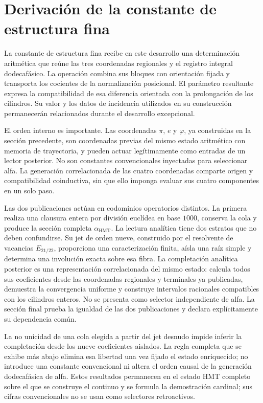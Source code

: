 \section{Derivación de la constante de estructura fina}
\label{sec:alpha}

La constante de estructura fina recibe en este desarrollo una determinación
aritmética que reúne las tres coordenadas regionales y el registro integral
dodecafásico. La operación combina sus bloques con orientación fijada y
transporta los cocientes de la normalización posicional. El parámetro
resultante expresa la compatibilidad de esa diferencia orientada con
la prolongación de los cilindros. Su valor y los datos de incidencia
utilizados en su construcción permanecerán relacionados durante el
desarrollo excepcional.

El orden interno es importante. Las coordenadas \(\pi\),
\(e\) y \(\varphi\), ya construidas en la sección precedente, son coordenadas
previas del mismo estado aritmético con memoria de trayectoria, y pueden actuar legítimamente como
entradas de un lector posterior. No son constantes convencionales
inyectadas para seleccionar alfa. La generación correlacionada de las cuatro coordenadas comparte origen y
compatibilidad coinductiva, sin que ello imponga evaluar sus cuatro
componentes en un solo paso.

Las dos publicaciones actúan en codominios operatorios distintos. La primera
realiza una clausura entera por división euclídea en base \(1000\), conserva la
cola y produce la sección completa \(\alpha_{\mathrm{HMT}}\). La lectura
analítica tiene dos estratos que no deben confundirse. Su jet de orden nueve,
construido por el resolvente de vacancias \(E_{21/22}\), proporciona una
caracterización finita, aísla una raíz simple y determina una involución
exacta sobre esa fibra. La completación analítica posterior es una
representación correlacionada del mismo estado: calcula todos sus coeficientes
desde las coordenadas regionales y terminales ya publicadas, demuestra la
convergencia uniforme y construye intervalos racionales compatibles con los
cilindros enteros. No se presenta como selector independiente de alfa. La
sección final prueba la igualdad de las dos publicaciones y declara
explícitamente su dependencia común.

La no unicidad de una cola elegida a partir del jet desnudo impide inferir la
completación desde los nueve coeficientes aislados. La regla completa que se
exhibe más abajo elimina esa libertad una vez fijado el estado enriquecido;
no introduce una constante convencional ni altera el orden causal de la
generación dodecafásica de alfa. Estos resultados permanecen en el estado HMT
completo sobre el que se construye el continuo y se formula la demostración
cardinal; sus cifras convencionales no se usan como selectores retroactivos.

